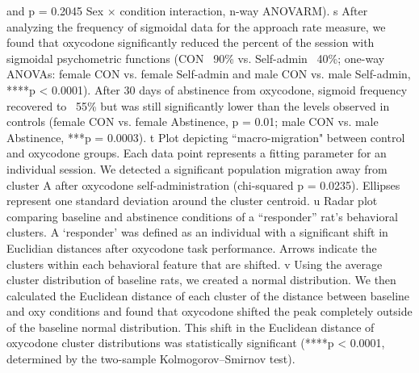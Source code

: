 \documentclass{article}
\begin{document}
\begin{singlespace}
and p = 0.2045 Sex × condition interaction, n-way ANOVARM). s After analyzing the frequency of sigmoidal data for the approach rate measure, we found that oxycodone significantly reduced the percent of the session with sigmoidal psychometric functions (CON ~90\% vs. Self-admin ~40\%; one-way ANOVAs: female CON vs. female Self-admin and male CON vs. male Self-admin, ****p < 0.0001). After 30 days of abstinence from oxycodone, sigmoid frequency recovered to ~55\% but was still significantly lower than the levels observed in controls (female CON vs. female Abstinence, p = 0.01; male CON vs. male Abstinence, ***p = 0.0003). t Plot depicting “macro-migration" between control and oxycodone groups. Each data point represents a fitting parameter for an individual session. We detected a significant population migration away from cluster A after oxycodone self-administration (chi-squared p = 0.0235). Ellipses represent one standard deviation around the cluster centroid. u Radar plot comparing baseline and abstinence conditions of a “responder” rat’s behavioral clusters. A ‘responder’ was defined as an individual with a significant shift in Euclidian distances after oxycodone task performance. Arrows indicate the clusters within each behavioral feature that are shifted. v Using the average cluster distribution of baseline rats, we created a normal distribution. We then calculated the Euclidean distance of each cluster of the distance between baseline and oxy conditions and found that oxycodone shifted the peak completely outside of the baseline normal distribution. This shift in the Euclidean distance of oxycodone cluster distributions was statistically significant (****p < 0.0001, determined by the two-sample Kolmogorov–Smirnov test).
\end{singlespace}



\vspace{1em}
\end{document}
